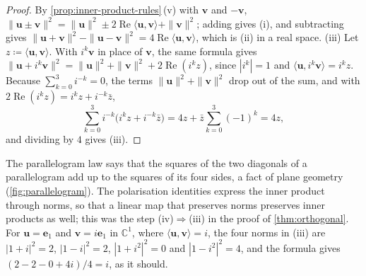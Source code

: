 \begin{proof}
By \cref{prop:inner-product-rules}\,(v) with $\mathbf v$ and $-\mathbf v$, $\|\mathbf u\pm\mathbf v\|^2=\|\mathbf u\|^2\pm2\operatorname{Re}\langle\mathbf u,\mathbf v\rangle+\|\mathbf v\|^2$; adding gives (i), and subtracting gives $\|\mathbf u+\mathbf v\|^2-\|\mathbf u-\mathbf v\|^2=4\operatorname{Re}\langle\mathbf u,\mathbf v\rangle$, which is (ii) in a real space. (iii) Let $z\coloneqq\langle\mathbf u,\mathbf v\rangle$. With $i^k\mathbf v$ in place of $\mathbf v$, the same formula gives $\|\mathbf u+i^k\mathbf v\|^2=\|\mathbf u\|^2+\|\mathbf v\|^2+2\operatorname{Re}(i^kz)$, since $|i^k|=1$ and $\langle\mathbf u,i^k\mathbf v\rangle=i^kz$. Because $\sum_{k=0}^3i^{-k}=0$, the terms $\|\mathbf u\|^2+\|\mathbf v\|^2$ drop out of the sum, and with $2\operatorname{Re}(i^kz)=i^kz+i^{-k}\bar z$,
\[
\sum_{k=0}^3i^{-k}\bigl(i^kz+i^{-k}\bar z\bigr)=4z+\bar z\sum_{k=0}^3(-1)^k=4z ,
\]
and dividing by $4$ gives (iii).
\end{proof}

The parallelogram law says that the squares of the two diagonals of a parallelogram add up to the squares of its four sides, a fact of plane geometry (\cref{fig:parallelogram}). The polarisation identities express the inner product through norms, so that a linear map that preserves norms preserves inner products as well; this was the step (iv)$\Rightarrow$(iii) in the proof of \cref{thm:orthogonal}. For $\mathbf u=\mathbf e_1$ and $\mathbf v=i\mathbf e_1$ in $\mathbb C^1$, where $\langle\mathbf u,\mathbf v\rangle=i$, the four norms in (iii) are $|1+i|^2=2$, $|1-i|^2=2$, $|1+i^2|^2=0$ and $|1-i^2|^2=4$, and the formula gives $(2-2-0+4i)/4=i$, as it should.

\begin{figure}
\end{figure}

